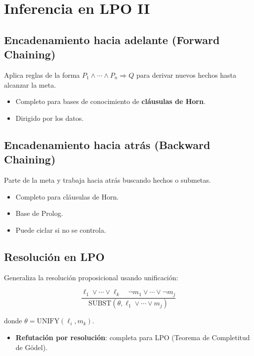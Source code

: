 \section{Inferencia en LPO II}

\subsection{Encadenamiento hacia adelante (Forward Chaining)}

Aplica reglas de la forma $P_1 \land \cdots \land P_n \Rightarrow Q$ para derivar nuevos hechos hasta alcanzar la meta.
\begin{itemize}
    \item Completo para bases de conocimiento de \textbf{cláusulas de Horn}.
    \item Dirigido por los datos.
\end{itemize}

\subsection{Encadenamiento hacia atrás (Backward Chaining)}

Parte de la meta y trabaja hacia atrás buscando hechos o submetas.
\begin{itemize}
    \item Completo para cláusulas de Horn.
    \item Base de Prolog.
    \item Puede ciclar si no se controla.
\end{itemize}

\subsection{Resolución en LPO}

Generaliza la resolución proposicional usando unificación:

$$\frac{\ell_1 \lor \cdots \lor \ell_k \quad \neg m_1 \lor \cdots \lor \neg m_j}{\text{SUBST}(\theta, \ell_1 \lor \cdots \lor m_j)}$$

donde $\theta = \text{UNIFY}(\ell_i, m_k)$.

\begin{itemize}
    \item \textbf{Refutación por resolución}: completa para LPO (Teorema de Completitud de Gödel).
\end{itemize}

